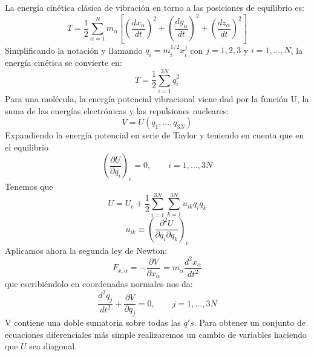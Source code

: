 \documentclass[a4paper]{article}
\begin{document}
La energía cinética clásica de vibración en torno a las posiciones de equilibrio es:
\begin{equation}
T= \frac{1}{2}\sum_{\alpha = 1}^Nm_\alpha\left[\left(\frac{dx_\alpha}{dt}\right)^2+\left(\frac{dy_\alpha}{dt}\right)^2+\left(\frac{dz_\alpha}{dt}\right)^2\right]
\end{equation}
Simplificando la notación y llamando $q_i=m_i^{1/2}x_i^j$ con $j=1,2,3$ y $i=1,...,N$, la energía cinética se convierte en:
\begin{equation}
T=\frac{1}{2}\sum_{i=1}^{3N}\dot q_i^2
\end{equation}
Para una molécula, la energía potencial vibracional viene dad por la función U, la suma de las energías electrónicas y las repulsiones nucleares:
\begin{equation}
V=U(q_1,...,q_{3N})
\end{equation}
Expandiendo la energía potencial en serie de Taylor y teniendo en cuenta que en el equilibrio
\begin{equation}
\left(\frac{\partial U}{\partial q_i}\right)_e=0, \qquad i= 1,...,3N
\end{equation}
Tenemos que
\begin{equation}
U = U_e + \frac{1}{2}\sum_{i=1}^{3N}\sum_{k=1}^{3N}u_{ik}q_iq_k
\end{equation}
\begin{equation}
u_{ik} \equiv \left(\frac{\partial^2U}{\partial q_i \partial q_k}\right)_e
\end{equation}
Aplicamos ahora la segunda ley de Newton:
\begin{equation}
F_{x,\alpha}=-\frac{\partial V}{\partial x_\alpha}=m_\alpha\frac{d^2x_\alpha}{dt^2}
\end{equation}
que escribiéndolo en coordenadas normales nos da:
\begin{equation}
\frac{d^2q_j}{dt^2}+\frac{\partial V}{\partial q_j}= 0, \qquad j=1,...,3N
\end{equation}
V contiene una doble sumatoria sobre todas las $q's$. Para obtener un conjunto de ecuaciones diferenciales más simple realizaremos un cambio de variables haciendo que $U$ sea diagonal.
\newpage
\printbibliography
\end{document}
